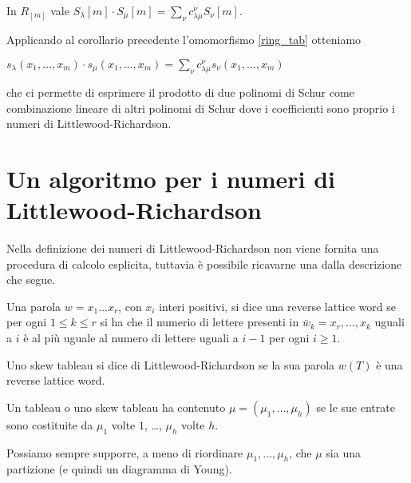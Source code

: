 \begin{cor}
In $R_{[m]}$ vale $S_{\lambda}[m] \cdot S_{\mu}[m] =
\sum\limits_{\nu} c_{\lambda \mu}^{\nu} S_{\nu}[m]$.
\end{cor}

\begin{oss}\label{lr_formula_pol_schur}
Applicando al corollario precedente l'omomorfismo \eqref{ring_tab}
otteniamo
\begin{center}\begin{math}
s_{\lambda}(x_1,\ldots,x_m) \cdot s_{\mu}(x_1,\ldots,x_m) =
\sum\limits_{\nu} c_{\lambda \mu}^{\nu} s_{\nu}(x_1,\ldots,x_m)
\end{math}\end{center}
che ci permette di esprimere il prodotto di due polinomi di Schur come
combinazione lineare di altri polinomi di Schur dove i coefficienti
sono proprio i numeri di Littlewood-Richardson.
\end{oss}

\section{Un algoritmo per i numeri di Littlewood-Richardson}
Nella definizione dei numeri di Littlewood-Richardson non viene
fornita una procedura di calcolo esplicita, tuttavia \`e possibile
ricavarne una dalla descrizione che segue.

\begin{defn}
Una parola $w=x_1\ldots x_r$, con $x_i$ interi positivi, si dice una reverse lattice word se per
ogni $1 \leq k \leq r$ si ha che il numerio di lettere presenti in
$\bar w_k = x_r,\ldots,x_k$ uguali a $i$ \`e
al pi\`u uguale al numero di lettere uguali a $i-1$ per ogni $i \geq
1$.
\end{defn}

\begin{defn}
Uno skew tableau si dice di Littlewood-Richardson se la sua parola
$w(T)$ \`e una reverse lattice word.
\end{defn}

\begin{defn}
Un tableau o uno skew tableau ha contenuto $\mu = (\mu_1, \ldots,
\mu_h)$ se le sue entrate sono costituite da $\mu_1$ volte $1$,
\ldots, $\mu_h$ volte $h$.
\end{defn}

\begin{oss}
Possiamo sempre supporre, a meno di riordinare $\mu_1, \ldots,\mu_h$,
che $\mu$ sia una partizione (e quindi un diagramma di Young).
\end{oss}

